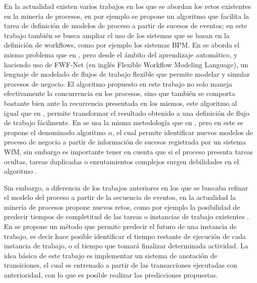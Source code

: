 En la actualidad existen varios trabajos en los que se abordan los retos existentes en la minería de procesos, en \cite{Agrawal1998} por ejemplo se propone un algoritmo que facilita la tarea de definición de modelos de proceso a partir de sucesos de eventos; en este trabajo también se busca ampliar el uso de los sistemas que se basan en la definición de workflows, como por ejemplo los sistemas BPM. En \cite{Zhang2003} se aborda el mismo problema que en \cite{Agrawal1998}, pero desde el ámbito del aprendizaje automático, y haciendo uso de FWF-Net (en inglés Flexible Workflow Modeling Language), un lenguaje de modelado de flujos de trabajo flexible que permite modelar y simular procesos de negocio. El algoritmo propuesto en este trabajo no solo maneja efectivamente la concurrencia en los procesos, sino que también se comporta bastante bien ante la recurrencia presentada en los mismos, este algoritmo al igual que en \cite{Agrawal1998}, permite transformar el resultado obtenido a una definición de flujo de trabajo fácilmente. En \cite{VanDerAalst2004_2} se usa la misma metodología que en \cite{Zhang2003}, pero en este se propone el denominado algoritmo $\alpha$, el cual permite identificar nuevos modelos de proceso de negocio a partir de información de sucesos registrada por un sistema WfM, sin embargo es importante tener en cuenta que si el proceso presenta tareas ocultas, tareas duplicadas o enrutamientos complejos surgen debilidades en el algoritmo \cite{Zhang2003}.

Sin embargo, a diferencia de los trabajos anteriores en los que se buscaba refinar el modelo del proceso a partir de la secuencia de eventos, en la actualidad la minería de procesos propone nuevos retos, como por ejemplo la posibilidad de predecir tiempos de completitud de las tareas o instancias de trabajo existentes \cite{Shun-ZhengYu2003}. En \cite{VanDerAalst2011} se propone un método que permite predecir el futuro de una instancia de trabajo, es decir hace posible identificar el tiempo restante de ejecución de cada instancia de trabajo, o el tiempo que tomará finalizar determinada actividad. La idea básica de este trabajo es implementar un sistema de anotación de transiciones, el cual es entrenado a partir de las transacciones ejecutadas con anterioridad, con lo que es posible realizar las predicciones propuestas.

